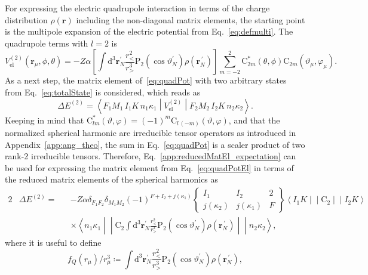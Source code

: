 For expressing the electric quadrupole interaction in terms of the charge distribution $\rho(\mathbf{r})$ including the non-diagonal matrix elements, the starting point is the multipole expansion of the electric potential from Eq.~\eqref{eq:defmulti}. The quadrupole terms with $l=2$ is
\begin{equation}
V^{(2)}_{\text{el}}(\mathbf{r}_\mu,\phi,\theta)=-Z\alpha \left[ \int \text{d}^3\mathbf{r}^{\prime}_N \frac{r_<^2}{r_>^{3}}\text{P}_{2}(\cos \vartheta_N^{\prime})\rho(\mathbf{r}_N^{\,\prime})\right]\sum_{m=-2}^2 \text{C}^*_{2m}(\theta,\phi)\text{C}_{2m}(\vartheta_\mu,\varphi_\mu).
\label{eq:quadPot}
\end{equation}
As a next step, the matrix element of~\eqref{eq:quadPot} with two arbitrary states from Eq.~\eqref{eq:totalState} is considered, which reads as
\begin{equation}
\Delta E^{(2)}=\left<F_1M_1\,I_1K \,n_1\kappa_1 \middle| V^{(2)}_{\text{el}} \middle|F_2M_2\,I_2K \,n_2\kappa_2 \right>.
\label{eq:quadPotEl}
\end{equation}
Keeping in mind that $\text{C}_{lm}^*(\vartheta,\varphi) =(-1)^m\text{C}_{l\,(-m)}(\vartheta,\varphi)$, and that the normalized spherical harmonic are irreducible tensor operators as introduced in Appendix~\ref{app:ang_theo}, the sum in Eq.~\eqref{eq:quadPot} is a scaler product of two rank-2 irreducible tensors. Therefore, Eq.~\eqref{app:reducedMatEl_expectation} can be used for expressing the matrix element from Eq.~\eqref{eq:quadPotEl} in terms of the reduced matrix elements of the spherical harmonics as
\begin{alignat}{2}
&\Delta E^{(2)} =&& -Z\alpha\delta_{F_1F_2}\delta_{M_1M_2} (-1)^{F+I_2+j(\kappa_1)}
\begin{Bmatrix}
I_1 & I_2 & 2 \\
j(\kappa_2) & j(\kappa_1)&F
\end{Bmatrix}
\left<I_1K\middle|\middle|\text{C}_2 \middle|\middle| I_2 K \right>\\[7.5pt]
&&&\times\left<n_1\kappa_1\middle|\middle|\text{C}_2  \int \text{d}^3\mathbf{r}^{\prime}_N \frac{r_<^2}{r_>^{3}}\text{P}_{2}(\cos \vartheta_N^{\prime})\rho(\mathbf{r}_N^{\,\prime}) \middle|\middle| n_2\kappa_2 \right>,
\label{eq:quadNonDiagEl}
\end{alignat}
where it is useful to define
\begin{equation}
\label{eq:quadDistr}
f_Q(r_\mu)/r_\mu^3 \coloneqq \int \text{d}^3\mathbf{r}^{\prime}_N \frac{r_<^2}{r_>^{3}}\text{P}_{2}(\cos \vartheta_N^{\prime})\rho(\mathbf{r}_N^{\,\prime}),
\end{equation}

